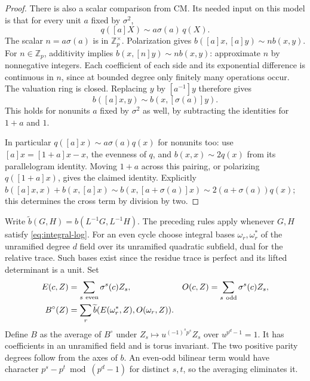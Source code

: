 \begin{proof}
There is also a scalar comparison from CM. Its needed input
on this model is that for every unit \(a\) fixed by \(\sigma^2\),
\begin{equation}\label{eq:cm-norm-relation}
                   q([a]X)\sim a\sigma(a)\,q(X).
\end{equation}
The scalar \(n=a\sigma(a)\) is in \(\mathbb Z_p^\times\).
Polarization gives \(b([a]x,[a]y)\sim n b(x,y)\).
For \(n\in\mathbb Z_p\), additivity implies
\(b(x,[n]y)\sim n b(x,y)\): approximate \(n\) by nonnegative
integers. Each coefficient of each side and its exponential
difference is continuous in \(n\), since at bounded degree
only finitely many operations occur. The valuation ring is
closed. Replacing \(y\) by \([a^{-1}]y\) therefore gives
\[
                        b([a]x,y)\sim b(x,[\sigma(a)]y).
\]
This holds for nonunits \(a\) fixed by \(\sigma^2\) as well,
by subtracting the identities for \(1+a\) and \(1\).

In particular \(q([a]x)\sim a\sigma(a)q(x)\) for nonunits too:
use \([a]x=[1+a]x-x\), the evenness of \(q\),
and \(b(x,x)\sim2q(x)\) from its parallelogram identity.
Moving \(1+a\) across this pairing, or polarizing
\(q([1+a]x)\), gives the claimed identity. Explicitly
\(b([a]x,x)+b(x,[a]x)\sim
b(x,[a+\sigma(a)]x)\sim2(a+\sigma(a))q(x)\);
this determines the cross term by division by two.

\end{proof}

Write \(\widetilde b(G,H)=b(L^{-1}G,L^{-1}H)\).
The preceding rules apply whenever \(G,H\) satisfy
\eqref{eq:integral-log}. For an even cycle choose integral
bases \(\omega_r,\omega_r^*\) of the unramified degree \(d\)
field over its unramified quadratic subfield, dual for the
relative trace. Such bases exist since the residue trace is
perfect and its lifted determinant is a unit. Set
\[
 \begin{aligned}
 E(c,Z)&=\sum_{s\ {\rm even}}\sigma^s(c)Z_s,&
 O(c,Z)&=\sum_{s\ {\rm odd}}\sigma^s(c)Z_s,\\
 B^\circ(Z)&=\sum_r\widetilde b(E(\omega_r^*,Z),O(\omega_r,Z)).
 \end{aligned}
\]
Define \(B\) as the average of \(B^\circ\) under
\(Z_s\mapsto u^{(-1)^s p^s}Z_s\) over \(u^{p^d-1}=1\). It
has coefficients in an unramified field and is torus invariant.
The two positive parity degrees follow from the axes of \(b\).
An even-odd bilinear term would have character
\(p^s-p^t\bmod(p^d-1)\) for distinct \(s,t\), so the averaging
eliminates it.

